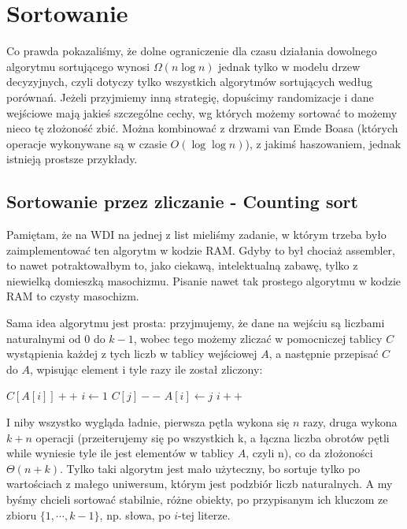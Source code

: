 \documentclass[../main.tex]{subfiles} %
\begin{document}
\chapter{Sortowanie}

Co prawda pokazaliśmy, że dolne ograniczenie dla czasu działania dowolnego algorytmu sortującego wynosi \(\Omega(n\log n)\) jednak tylko w modelu drzew decyzyjnych, czyli dotyczy tylko wszystkich algorytmów sortujących według porównań. Jeżeli przyjmiemy inną strategię, dopuścimy randomizacje i dane wejściowe mają jakieś szczególne cechy, wg których możemy sortować to możemy nieco tę złożoność zbić. Można kombinować z drzwami van Emde Boasa (których operacje wykonywane są w czasie \(O(\log \log n)\)), z jakimś haszowaniem, jednak istnieją prostsze przykłady.

\section{Sortowanie przez zliczanie - Counting sort}

Pamiętam, że na WDI na jednej z list mieliśmy zadanie, w którym trzeba było zaimplementować ten algorytm w kodzie RAM. Gdyby to był chociaż assembler, to nawet potraktowałbym to, jako ciekawą, intelektualną zabawę, tylko z niewielką domieszką masochizmu. Pisanie nawet tak prostego algorytmu w kodzie RAM to czysty masochizm.

Sama idea algorytmu jest prosta: przyjmujemy, że dane na wejściu są liczbami naturalnymi od 0 do \(k - 1\), wobec tego możemy zliczać w pomocniczej tablicy \(C\) wystąpienia każdej z tych liczb w tablicy wejściowej \(A\), a następnie przepisać \(C\) do \(A\), wpisując element i tyle razy ile został zliczony:
\begin{algorithmic}
 \State $C[A[i]]++$
\EndFor
\State $i \gets 1$
		\State $C[j]--$
		\State $A[i] \gets j$
		\State $i++$
	\EndWhile
\EndFor

\end{algorithmic}

I niby wszystko wygląda ładnie, pierwsza pętla wykona się \(n\) razy, druga wykona \(k + n\) operacji (przeiterujemy się po wszystkich k, a łączna liczba obrotów pętli while wyniesie tyle ile jest elementów w tablicy \(A\), czyli n), co da złożoności \(\Theta(n + k)\). Tylko taki algorytm jest mało użyteczny, bo sortuje tylko po wartościach z małego uniwersum, którym jest podzbiór liczb naturalnych. A my byśmy chcieli sortować stabilnie, różne obiekty, po przypisanym ich kluczom ze zbioru \(\{1, \cdots, k - 1\}\), np. słowa, po \(i\)-tej literze.
\end{document}
